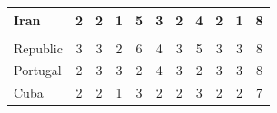 \documentclass[12pt]{article}  %
\begin{document}
\begin{subappendices}
\begin{longtable}{|l|c|c|c|c|c|c|c|c|c|c|}
	\hline
	Iran                                                           & 2                                                                      & 2                                                                      & 1                                                                      & 5                                                                      & 3                                                                      & 2                                                                      & 4                         & 2                           & 1                           & 8                           \\ 
	\hline
	\begin{tabular}[c]{@{}l@{}}Dominican \\Republic\end{tabular}   & 3                                                                      & 3                                                                      & 2                                                                      & 6                                                                      & 4                                                                      & 3                                                                      & 5                         & 3                           & 3                           & 8                           \\ 
	\hline
	Portugal                                                       & 2                                                                      & 3                                                                      & 3                                                                      & 2                                                                      & 4                                                                      & 3                                                                      & 2                         & 3                           & 3                           & 8                           \\ 
	\hline
	Cuba                                                           & 2                                                                      & 2                                                                      & 1                                                                      & 3                                                                      & 2                                                                      & 2                                                                      & 3                         & 2                           & 2                           & 7                           \\ 

\end{longtable}
\end{subappendices}
\end{document}
